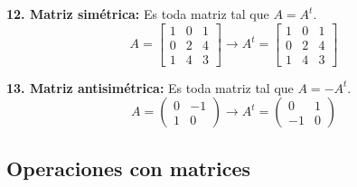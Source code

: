 \documentclass[11pt,a4paper]{article}
\begin{document}
\begin{minipage}[t]{0.485\textwidth}
\textbf{12. Matriz simétrica:} Es toda matriz tal que $A = A^t$.
\[
A = \begin{bmatrix} 1 & 0 & 1\\ 0 & 2 & 4\\ 1 & 4 & 3\end{bmatrix}
\rightarrow
A^t = \begin{bmatrix} 1 & 0 & 1\\ 0 & 2 & 4\\ 1 & 4 & 3\end{bmatrix}
\]
\end{minipage}\hfill
\begin{minipage}[t]{0.485\textwidth}
\textbf{13. Matriz antisimétrica:} Es toda matriz tal que $A = -A^t$.
\[
A = \begin{pmatrix} 0 & -1\\ 1 & 0\end{pmatrix}
\rightarrow
A^t = \begin{pmatrix} 0 & 1\\ -1 & 0\end{pmatrix}
\]
\end{minipage}

\subsection*{Operaciones con matrices}
\end{document}

